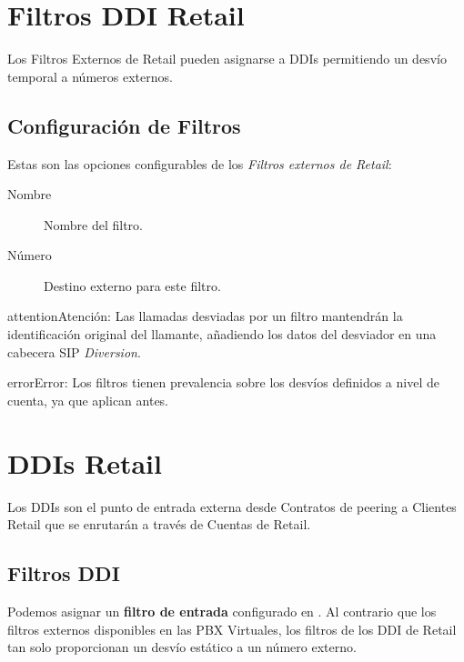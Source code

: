 \documentclass[letterpaper,10pt,spanish]{sphinxmanual}
\begin{document}
\section{Filtros DDI Retail}
\label{retail/retail_filters:retail-ddi-filters}\label{retail/retail_filters::doc}\label{retail/retail_filters:retail-filters}
Los Filtros Externos de Retail pueden asignarse a DDIs permitiendo un desvío temporal a números externos.


\subsection{Configuración de Filtros}
\label{retail/retail_filters:filters-configuration}
Estas son las opciones configurables de los \emph{Filtros externos de Retail}:
\begin{description}
\item[{Nombre}] \leavevmode{}\label{retail/retail_filters:term-name}
Nombre del filtro.

\item[{Número}] \leavevmode{}\label{retail/retail_filters:term-number}
Destino externo para este filtro.

\end{description}

\begin{notice}{attention}{Atención:}
Las llamadas desviadas por un filtro mantendrán la identificación original del llamante, añadiendo los datos del desviador en una cabecera SIP \emph{Diversion}.
\end{notice}

\begin{notice}{error}{Error:}
Los filtros tienen prevalencia sobre los desvíos definidos a nivel de cuenta, ya que aplican antes.
\end{notice}


\section{DDIs Retail}
\label{retail/retail_ddis::doc}\label{retail/retail_ddis:retail-ddis}\label{retail/retail_ddis:id1}
Los DDIs son el punto de entrada externa desde Contratos de peering a Clientes Retail que se enrutarán a través de Cuentas de Retail.


\subsection{Filtros DDI}
\label{retail/retail_ddis:ddi-filters}
Podemos asignar un \textbf{filtro de entrada} configurado en {\hyperref[retail/retail_filters:retail\string-filters]{}}. Al contrario que los filtros externos disponibles en las PBX Virtuales, los filtros de los DDI de Retail tan solo proporcionan un desvío estático a un número externo.
\end{document}
